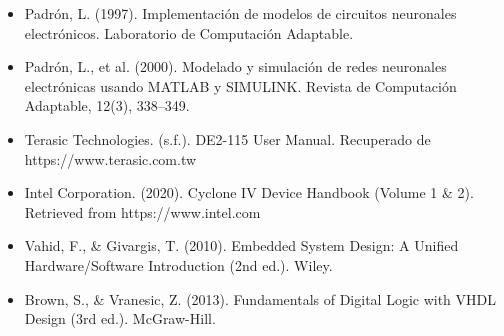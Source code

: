 \begin{itemize}
\item Padrón, L. (1997). Implementación de modelos de circuitos neuronales electrónicos. Laboratorio de Computación Adaptable.
\item Padrón, L., et al. (2000). Modelado y simulación de redes neuronales electrónicas usando MATLAB y SIMULINK. Revista de Computación Adaptable, 12(3), 338–349.
\item Terasic Technologies. (s.f.). DE2-115 User Manual. Recuperado de https://www.terasic.com.tw
\item Intel Corporation. (2020). Cyclone IV Device Handbook (Volume 1 \& 2). Retrieved from https://www.intel.com
\item Vahid, F., \& Givargis, T. (2010). Embedded System Design: A Unified Hardware/Software Introduction (2nd ed.). Wiley.
\item Brown, S., \& Vranesic, Z. (2013). Fundamentals of Digital Logic with VHDL Design (3rd ed.). McGraw-Hill.

\end{itemize}
















\endinput 

